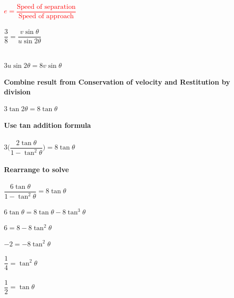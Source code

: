 \documentclass{article}[18pt]
\begin{document}
\\
\textcolor{red}{$e=\dfrac{\text{Speed of separation}}{\text{Speed of approach}}$}\\
\\
$\dfrac{3}{8}=\dfrac{v\sin\theta}{u\sin2\theta}$\\
\\
\\
$3u\sin2\theta=8v\sin\theta$\\
\\
\textbf{Combine result from Conservation of velocity and Restitution by division}\\
\\
$3\tan2\theta=8\tan\theta$\\
\\
\textbf{Use tan addition formula}\\
\\
$3\Bigg(\dfrac{2\tan\theta}{1-\tan^2\theta}\Bigg)=8\tan\theta$\\
\\
\textbf{Rearrange to solve}\\
\\
$\dfrac{6\tan\theta}{1-\tan^2\theta}=8\tan\theta$\\
\\
$6\tan\theta=8\tan\theta-8\tan^3\theta$\\
\\
$6=8-8\tan^2\theta$\\
\\
$-2=-8\tan^2\theta$\\
\\
$\dfrac{1}{4}=\tan^2\theta$\\
\\
$\dfrac{1}{2}=\tan\theta$
\end{document}
